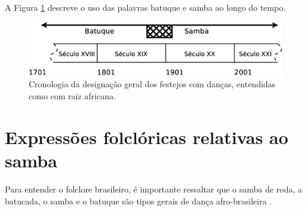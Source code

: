 A Figura \ref{fig:sambacrono} descreve o uso das palavras batuque e samba ao longo do tempo.
\begin{figure}[h]
  \centering
    \includegraphics[width=1.0\textwidth]{chapters/cap-historia-samba/samba-crono.eps}
  \caption{Cronologia da designação geral dos festejos com danças, entendidas como com raiz africana.}
  \label{fig:sambacrono}
\end{figure}

\section{Expressões folclóricas relativas ao samba}

Para entender o folclore brasileiro, 
é importante ressaltar que o samba de roda, a batucada, 
o samba e o batuque são tipos gerais de dança afro-brasileira \cite[pp. 8]{reffolclorebatucadajornal} \cite[pp. 21]{jornalsambaderoda1}.
 

